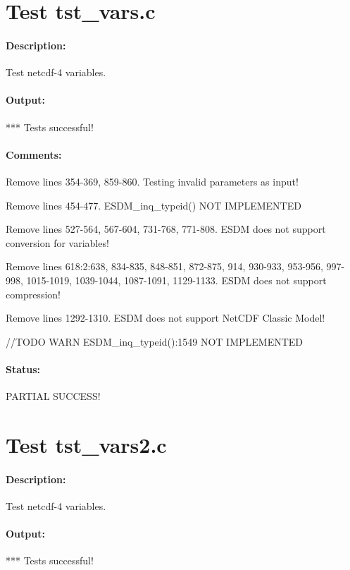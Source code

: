 \section{Test tst\_vars.c}

\paragraph{Description:} Test netcdf-4 variables.

\paragraph{Output:} *** Tests successful!

\paragraph{Comments:} Remove lines 354-369, 859-860. Testing invalid parameters as input!

Remove lines 454-477. ESDM\_inq\_typeid() NOT IMPLEMENTED

Remove lines 527-564, 567-604, 731-768, 771-808. ESDM does not support conversion for variables!

Remove lines 618:2:638, 834-835, 848-851, 872-875, 914, 930-933, 953-956, 997-998, 1015-1019, 1039-1044, 1087-1091, 1129-1133. ESDM does not support compression!

Remove lines 1292-1310. ESDM does not support NetCDF Classic Model!

//TODO WARN ESDM\_inq\_typeid():1549 NOT IMPLEMENTED

\paragraph{Status:} PARTIAL SUCCESS!

\section{Test tst\_vars2.c}

\paragraph{Description:} Test netcdf-4 variables.

\paragraph{Output:} *** Tests successful!


